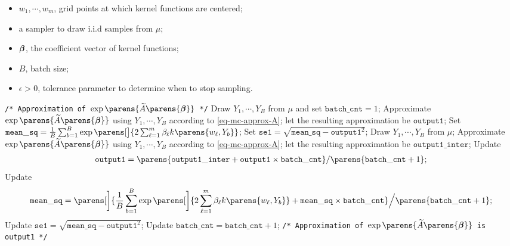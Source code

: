 \begin{algorithm}
\caption{Batch Monte Carlo method}\label{algo-bmc}
\begin{algorithmic}[1]
\Statex \algorithmicrequire 
\begin{itemize}\setlength\itemsep{0em}
	\item $w_1, \cdots, w_m$, grid points at which kernel functions are centered; 
	\item a sampler to draw i.i.d samples from $\mu$; 
	\item $\boldsymbol{\beta}$, the coefficient vector of kernel functions; 
	\item $B$, batch size; 
	\item $\epsilon > 0$, tolerance parameter to determine when to stop sampling. 
\end{itemize}

\vspace{5pt}

\noindent \texttt{/* Approximation of $\exp \parens{\widetilde{A} \parens{\bbeta}}$ */}
\State Draw $Y_1, \cdots, Y_B$ from $\mu$ and set $\mathtt{batch\_cnt} = 1$; 
\State Approximate $\exp \parens{\widetilde{A} \parens{\bbeta}}$ using $Y_1, \cdots, Y_B$ according to \eqref{eq-mc-approx-A}; let the resulting approximation be $\mathtt{output1}$; 
\State Set $\mathtt{mean\_sq} = \frac{1}{B} \sum_{b=1}^B \exp \parens[\big]{2 \sum_{\ell=1}^m \beta_{\ell} k \parens{w_\ell, Y_b} }$; 
\State Set $\mathtt{se1} = \sqrt{\mathtt{mean\_sq} - \mathtt{output1}^2}$; \label{algo-step1}
\State Draw $Y_1, \cdots, Y_B$ from $\mu$; 
\State Approximate $\exp \parens{\widetilde{A} \parens{\bbeta}}$ using $Y_1, \cdots, Y_B$ according to \eqref{eq-mc-approx-A}; let the resulting approximation be $\mathtt{output1\_inter}$; 
\State Update 
\begin{align*}
	\mathtt{output1} = \parens{\mathtt{output1\_inter} + \mathtt{output1} \times \mathtt{batch\_cnt}} / \parens{\mathtt{batch\_cnt} + 1}; 
\end{align*}
\State Update 
\begin{align*}
	\mathtt{mean\_sq} = \parens[\bigg]{\frac{1}{B} \sum_{b=1}^B \exp \parens[\bigg]{2 \sum_{\ell=1}^m \beta_{\ell} k \parens{w_\ell, Y_b} } + \mathtt{mean\_sq} \times \mathtt{batch\_cnt}} \Big/ \parens{\mathtt{batch\_cnt} + 1}; 
\end{align*}
\State Update $\mathtt{se1} = \sqrt{\mathtt{mean\_sq} - \mathtt{output1}^2}$; \label{algo-step2}
\State Update $\mathtt{batch\_cnt} = \mathtt{batch\_cnt} + 1$; 
\EndWhile
\Statex \texttt{/* Approximation of $\exp \parens{\widetilde{A} \parens{\bbeta}}$ is output1 */}
\end{algorithmic}
\end{algorithm}

